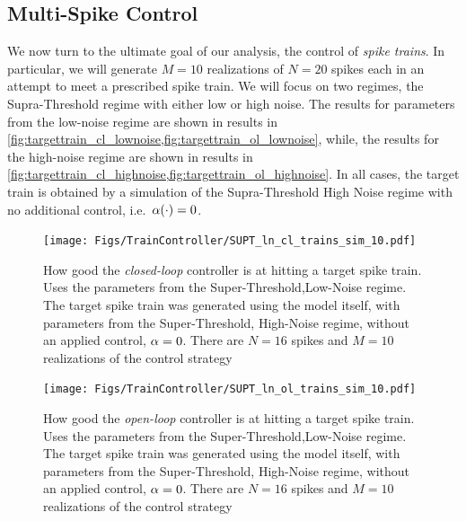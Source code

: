 \documentclass[12pt]{iopart}
\begin{document}
\subsection{Multi-Spike Control}
We now turn to the ultimate goal of our analysis, the control of {\sl spike
trains}. In particular, we will generate $M=10$ realizations of $N=20$ spikes
each in an attempt to meet a prescribed spike train. We will focus on two
regimes, the Supra-Threshold regime with either low or high noise.
The results
for parameters from the low-noise regime are shown in
results in \cref{fig:targettrain_cl_lownoise,fig:targettrain_ol_lownoise}, 
while, the results
for the high-noise regime are shown in
results in
\cref{fig:targettrain_cl_highnoise,fig:targettrain_ol_highnoise}. In all cases,
the target train is obtained by a simulation of the Supra-Threshold High Noise
regime with no additional control, i.e.\ ${\alpha}(\cdot) = 0$.
\begin{figure}[htp]
\begin{center}
  \texttt{[image: Figs/TrainController/SUPT\_ln\_cl\_trains\_sim\_10.pdf]}
  \caption[ ]{How good the {\sl closed-loop} controller is at hitting a target
  spike train. Uses the parameters from the Super-Threshold,Low-Noise regime.
  The target spike train was generated using the model itself, with
  parameters from the Super-Threshold, High-Noise regime, without an applied
  control, ${\alpha}=0$.
  There are $N=16$ spikes and $M=10$ realizations of the control strategy} 
  \label{fig:targettrain_cl_lownoise}
\end{center}
\end{figure}  
\begin{figure}[htp] 
\begin{center}
  \texttt{[image: Figs/TrainController/SUPT\_ln\_ol\_trains\_sim\_10.pdf]}
  \caption[ ]{How good the {\sl open-loop} controller is at hitting a target
  spike train. Uses the parameters from the Super-Threshold,Low-Noise regime.
  The target spike train was generated using the model itself, with
  parameters from the Super-Threshold, High-Noise regime, without an applied
  control, ${\alpha}=0$.
  There are $N=16$ spikes and $M=10$ realizations of the control strategy}
  \label{fig:targettrain_ol_lownoise}
\end{center} 
\end{figure}
\end{document}
